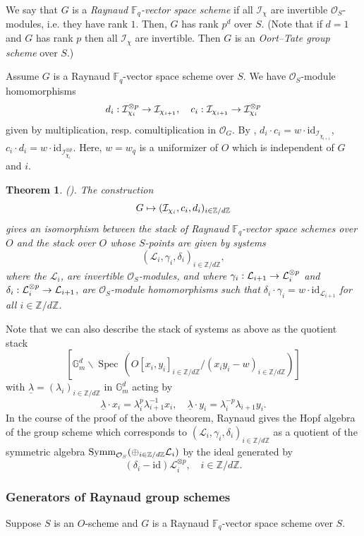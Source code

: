 \documentclass[reqno, 10pt]{amsart}
\makeatletter
\newcommand{\BF}{\ensuremath{\mathbb {F}}\xspace}
\newcommand{\BG}{\ensuremath{\mathbb {G}}\xspace}
\newcommand{\BZ}{\ensuremath{\mathbb {Z}}\xspace}
\newcommand{\CI}{\ensuremath{\mathcal {I}}\xspace}
\newcommand{\CL}{\ensuremath{\mathcal {L}}\xspace}
\newcommand{\CO}{\ensuremath{\mathcal {O}}\xspace}
\newcommand{\id}{\ensuremath{\mathrm{id}}\xspace}
\DeclareMathOperator{\Spec}{Spec\,}
\newcommand{\bs}{\backslash}
\newtheorem{theorem}[subsubsection]{Theorem}
\theoremstyle{definition}
\numberwithin{equation}{subsection}
\numberwithin{subsubsection}{subsection}
\renewcommand{\to}{%
   \ifbool{@display}{\longrightarrow}{\rightarrow}%
   }
\let\shortmapsto\mapsto
\renewcommand{\mapsto}{%
   \ifbool{@display}{\shortmapsto}{\shortmapsto}%
   }
\newcommand{\und}{\underline}
\newcommand{\ga}{\gamma}
\newcommand{\de}{\delta}
\makeatother
\begin{document}
 We say that $G$ is a \emph{Raynaud $\BF_q$-vector space scheme} 
 if all $\CI_\chi$ are invertible $\CO_S$-modules, i.e. they have rank $1$. Then, $G$ has rank $p^d$ over $S$.
(Note that if $d=1$ and  $G$ has rank $p$ then all $\CI_\chi$ are invertible. Then $G$ is an \emph{Oort--Tate group scheme} over $S$.)

Assume $G$ is a Raynaud $\BF_q$-vector space scheme over $S$. We have $\CO_S$-module homomorphisms
 \[
 d_i: \CI_{\chi_i}^{\otimes p}\to \CI_{\chi_{i+1}},\quad c_i: \CI_{\chi_{i+1}}\to \CI_{\chi_{i}}^{\otimes p}
 \]
 given by multiplication, resp. comultiplication in $\CO_G$. By \cite[1.4]{Ray}, $d_i\cdot c_i=w\cdot \id_{\CI_{\chi_{i+1}}}$,
 $c_i\cdot d_i=w\cdot \id_{\CI_{\chi_i}^{\otimes p}}$. Here, $w=w_q$ is a uniformizer of $O$ which is independent of $G$ and $i$.
 
\begin{theorem}\label{thm:ray} (\cite[Thm. 1.4.1]{Ray}). The construction 
 \[
 G\mapsto ( \CI_{\chi_i}, c_i, d_i)_{i\in \BZ/d\BZ}
 \]
  gives an isomorphism between  the stack of Raynaud $\BF_q$-vector space schemes over $O$
 and the stack over $O$ whose $S$-points are given by systems
 \[
 (\CL_i, \ga_i, \de_i)_{i\in \BZ/d\BZ},
 \]
 where the $\CL_i$,  are invertible $\CO_S$-modules, and where $\ga_i: \CL_{i+1}\to\CL_i^{\otimes p}$ and  $\de_i: \CL_i^{\otimes p}\to \CL_{i+1}$,
 are $\CO_S$-module homomorphisms such that $\de_i\cdot \ga_i=w\cdot \id_{\CL_{i+1}}$ for all $i\in \BZ/d\BZ$. 
 \end{theorem} 
 
 
 
 Note that we can also describe the stack of systems as above as the quotient stack
 \[
[ \BG_m^d\bs \Spec(O[x_i, y_i]_{i\in \BZ/d\BZ}/(x_iy_i-w)_{i\in \BZ/d\BZ})] 
 \]
 with $\und\lambda=(\lambda_i)_{i\in \BZ/d\BZ}$ in $\BG_m^d$ acting by 
 \[
\und\lambda\cdot x_i=\lambda_i^p\lambda_{i+1}^{-1} x_i,\quad \und\lambda\cdot y_i=\lambda_i^{-p}\lambda_{i+1} y_i.
 \]
 In the course of the proof of the above theorem, Raynaud gives the Hopf algebra of the group scheme which corresponds to $ (\CL_i, \ga_i, \de_i)_{i\in \BZ/d\BZ}$ as a quotient of the symmetric algebra ${\rm Symm}_{\CO_S}(\oplus_{i\in \BZ/d\BZ} \CL_i)$ by the ideal generated by
 \[
 (\de_i-\id)\CL^{\otimes p}_i,\quad  i\in \BZ/d\BZ.
 \]

\subsubsection{Generators of Raynaud group schemes}\label{sss:Generators} Suppose $S$ is an $O$-scheme and   $G$ is a Raynaud $\BF_q$-vector space scheme over $S$. 
\end{document}
